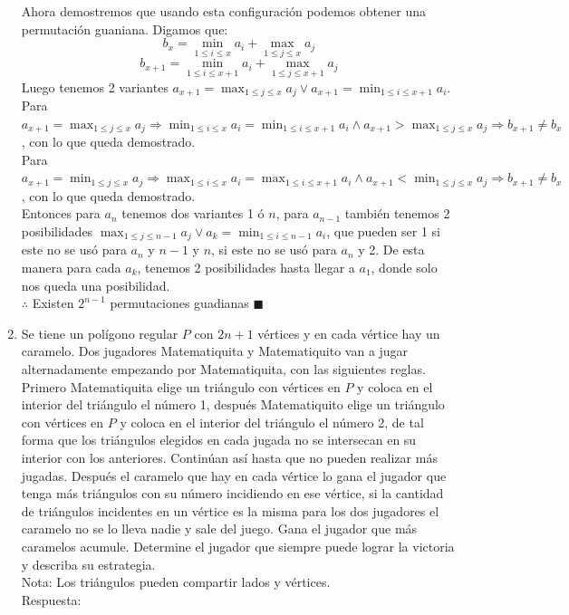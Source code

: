 \documentclass{book}
\begin{document}
\begin{enumerate}
			Ahora demostremos que usando esta configuración podemos obtener una permutación guaniana. Digamos que: 
			$$b_x=\min_{1\leq i\leq x}a_i+\max_{1\leq j\leq x} a_j$$
			$$b_{x+1}=\min_{1\leq i\leq x+1}a_i+\max_{1\leq j\leq x+1} a_j$$
			Luego tenemos 2 variantes $a_{x+1}=\max_{1\leq j\leq x} a_j\vee a_{x+1}=\min_{1\leq i\leq x+1}a_i$. \\
			Para $a_{x+1}=\max_{1\leq j\leq x} a_j\Rightarrow \min_{1\leq i\leq x}a_i=\min_{1\leq i\leq x+1}a_i\wedge a_{x+1}>\max_{1\leq j\leq x} a_j\Rightarrow b_{x+1}\neq b_{x}$, con lo que queda demostrado.\\
			 Para $a_{x+1}=\min_{1\leq j\leq x} a_j\Rightarrow \max_{1\leq i\leq x}a_i=\max_{1\leq i\leq x+1}a_i\wedge a_{x+1}<\min_{1\leq j\leq x} a_j\Rightarrow b_{x+1}\neq b_{x}$, con lo que queda demostrado.\\
			Entonces para $a_n$ tenemos dos variantes 1 ó $n$, para $a_{n-1}$ también tenemos 2 posibilidades $\max_{1\leq j\leq n-1} a_j\vee a_k=\min_{1\leq i\leq n-1}a_i$, que pueden ser 1 si este no se usó para $a_n$ y $n-1$ y  $n$, si este no se usó para $a_n$ y 2. De esta manera para cada $a_k$, tenemos 2 posibilidades hasta llegar a $a_1$, donde solo nos queda una posibilidad. \\
			$\therefore$ Existen $2^{n-1}$ permutaciones guadianas $\blacksquare$\\
			\item Se tiene un polígono regular $P$ con $2n+1$ vértices y en cada vértice hay un caramelo. Dos jugadores Matematiquita y Matematiquito van a jugar alternadamente empezando por Matematiquita, con las siguientes reglas. Primero Matematiquita elige un triángulo con vértices en $P$ y coloca en el interior del triángulo el número 1, después Matematiquito elige un triángulo con vértices en $P$ y coloca en el interior del triángulo el número 2, de tal forma que los triángulos elegidos en cada jugada no se intersecan en su interior con los anteriores. Continúan así hasta que no pueden realizar más jugadas. Después el caramelo que hay en cada vértice lo gana el jugador que tenga más triángulos con su número incidiendo en ese vértice, si la cantidad de triángulos incidentes en un vértice es la misma para los dos jugadores el caramelo no se lo lleva nadie y sale del juego. Gana el jugador que más caramelos acumule. Determine el jugador que siempre puede lograr la victoria y describa su estrategia.\\
			Nota: Los triángulos pueden compartir lados y vértices.\\
			Respuesta:\\

\end{enumerate}
\end{document}
